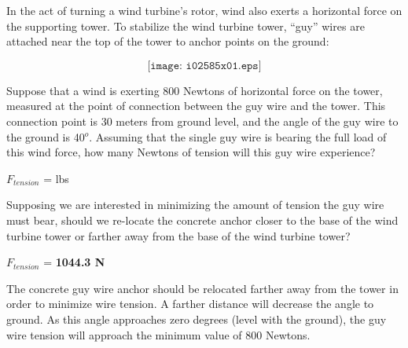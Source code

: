 

In the act of turning a wind turbine's rotor, wind also exerts a horizontal force on the supporting tower.  To stabilize the wind turbine tower, ``guy'' wires are attached near the top of the tower to anchor points on the ground:

$$\texttt{[image: i02585x01.eps]}$$

Suppose that a wind is exerting 800 Newtons of horizontal force on the tower, measured at the point of connection between the guy wire and the tower.  This connection point is 30 meters from ground level, and the angle of the guy wire to the ground is 40$^{o}$.  Assuming that the single guy wire is bearing the full load of this wind force, how many Newtons of tension will this guy wire experience?

\vskip 10pt

$F_{tension}$ = \underbar{\hskip 50pt} lbs

\vskip 10pt

Supposing we are interested in minimizing the amount of tension the guy wire must bear, should we re-locate the concrete anchor closer to the base of the wind turbine tower or farther away from the base of the wind turbine tower?







$F_{tension}$ = {\bf 1044.3 N}

\vskip 10pt

The concrete guy wire anchor should be relocated farther away from the tower in order to minimize wire tension.  A farther distance will decrease the angle to ground.  As this angle approaches zero degrees (level with the ground), the guy wire tension will approach the minimum value of 800 Newtons.












